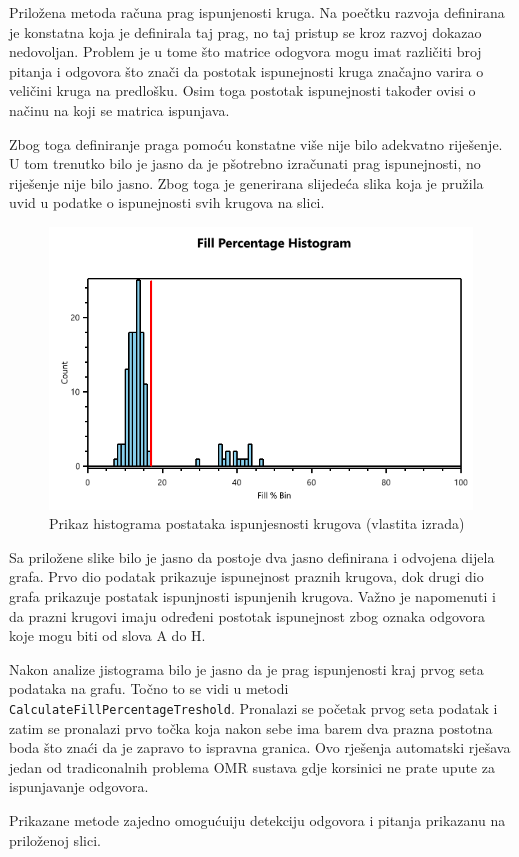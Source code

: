 \documentclass{foi}
\begin{document}
Priložena metoda računa prag ispunjenosti kruga. Na poečtku razvoja definirana je konstatna koja je definirala taj prag, no taj pristup se kroz razvoj dokazao nedovoljan. Problem je u tome što matrice odogvora mogu imat različiti broj pitanja i odgovora što znači da postotak ispunejnosti kruga značajno varira o veličini kruga na predlošku. Osim toga postotak ispunejnosti također ovisi o načinu na koji se matrica ispunjava. 

Zbog toga definiranje praga pomoću konstatne više nije bilo adekvatno riješenje. U tom trenutko bilo je jasno da je pšotrebno izračunati prag ispunejnosti, no riješenje nije bilo jasno. Zbog toga je generirana slijedeća slika koja je pružila uvid u podatke o ispunejnosti svih krugova na slici.

\begin{figure}[H]
\centering
\includegraphics[width=0.7\linewidth]{slike/histogram.png}
\caption{Prikaz histograma postataka ispunjesnosti krugova (vlastita izrada)}
\end{figure}
\pagebreak
Sa priložene slike bilo je jasno da postoje dva jasno definirana i odvojena dijela grafa. Prvo dio podatak prikazuje ispunejnost praznih krugova, dok drugi dio grafa prikazuje postatak ispunjnosti ispunjenih krugova. Važno je napomenuti i da prazni krugovi imaju određeni postotak ispunejnost zbog oznaka odgovora koje mogu biti od slova A do H. 

Nakon analize jistograma bilo je jasno da je prag ispunjenosti kraj prvog seta podataka na grafu. Točno to se vidi u metodi \texttt{CalculateFillPercentageTreshold}. Pronalazi se početak prvog seta podatak i zatim se pronalazi prvo točka koja nakon sebe ima barem dva prazna postotna boda što znaći da je zapravo to ispravna granica. Ovo rješenja automatski rješava jedan od tradiconalnih problema OMR sustava gdje korsinici ne prate upute za ispunjavanje odgovora.


Prikazane metode zajedno omogućuiju detekciju odgovora i pitanja prikazanu na priloženoj slici.
\end{document}
